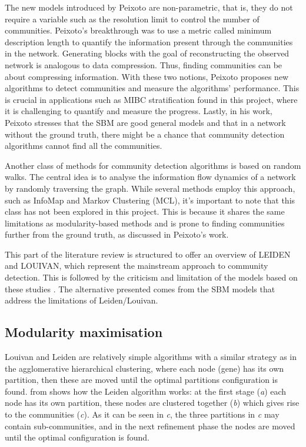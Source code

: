 The new models introduced by Peixoto are non-parametric, that is, they do not require a variable such as the resolution limit to control the number of communities. Peixoto's breakthrough was to use a metric called minimum description length to quantify the information present through the communities in the network. Generating blocks with the goal of reconstructing the observed network is analogous to data compression. Thus, finding communities can be about compressing information. With these two notions, Peixoto proposes new algorithms to detect communities and measure the algorithms' performance. This is crucial in applications such as MIBC stratification found in this project, where it is challenging to quantify and measure the progress. Lastly, in his work, Peixoto stresses that the SBM are good general models and that in a network without the ground truth, there might be a chance that community detection algorithms cannot find all the communities.

Another class of methods for community detection algorithms is based on random walks. The central idea is to analyse the information flow dynamics of a network by randomly traversing the graph. While several methods employ this approach, such as InfoMap and Markov Clustering (MCL), it's important to note that this class has not been explored in this project. This is because it shares the same limitations as modularity-based methods and is prone to finding communities further from the ground truth, as discussed in Peixoto's work. 

This part of the literature review is structured to offer an overview of \gls{LEIDEN} and \gls{LOUIVAN}, which represent the mainstream approach to community detection. This is followed by the criticism and limitation of the models based on these studies \citep{Peixoto2021-jx, Peixoto2023-rt, Shemirani2023-ww}. The alternative presented comes from the SBM models that address the limitations of Leiden/Louivan.


\subsection{Modularity maximisation} \label{s:lit:mod_max}

Louivan \citep{Blondel2008-ik} and Leiden \citep{Traag2019-ne} are relatively simple algorithms with a similar strategy as in the agglomerative hierarchical clustering, where each node (gene) has its own partition, then these are moved until the optimal partitions configuration is found.  from \cite{Traag2019-ne} shows how the Leiden algorithm works: at the first stage (\textit{a}) each node has its own partition, these nodes are clustered together (\textit{b}) which gives rise to the communities (\textit{c}). As it can be seen in \textit{c}, the three partitions in \textit{c} may contain sub-communities, and in the next refinement phase the nodes are moved until the optimal configuration is found.

